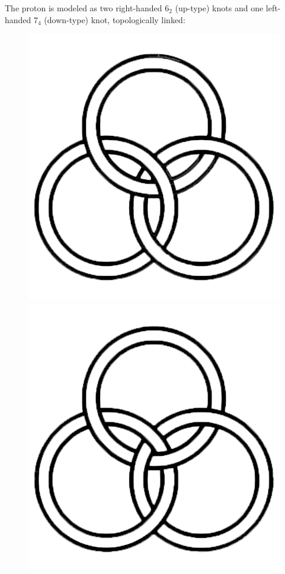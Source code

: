 \documentclass[12pt]{article}
\begin{document}
The proton is modeled as two right-handed \( 6_2 \) (up-type) knots and one left-handed \( 7_4 \) (down-type) knot, topologically linked:


  \begin{figure}[H]
\centering
\begin{minipage}{0.25\textwidth}
    \centering
             \includegraphics[width=\textwidth]{images/aborromean}
\end{minipage}
\hspace{1em}
\begin{minipage}{0.25\textwidth}
    \centering
            \includegraphics[width=\textwidth]{images/borromean}

\end{minipage}
\end{figure}
\end{document}
